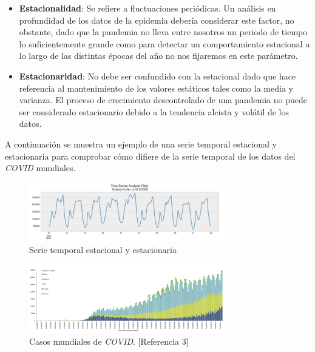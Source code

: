 \documentclass[12pt,a4paper, xcolor=table]{article}
\begin{document}
    \begin{itemize}
    \item \textbf{Estacionalidad}: Se refiere a fluctuaciones periódicas. Un análisis en profundidad de los datos de la epidemia debería considerar este factor, no obstante, dado que la pandemia no lleva entre nosotros un periodo de tiempo lo suficientemente grande como para detectar un comportamiento estacional a lo largo de las distintas épocas del año no nos fijaremos en este parámetro.
    \item \textbf{Estacionaridad}: No debe ser confundido con la estacional dado que hace referencia al mantenimiento de los valores estáticos tales como la media y varianza. El proceso de crecimiento descontrolado de una pandemia no puede ser considerado estacionario debido a la tendencia alcista y volátil de los datos.
    \end{itemize}

    A continuación se muestra un ejemplo de una serie temporal estacional y estacionaria para comprobar cómo difiere de la serie temporal de los datos del \textit{COVID} mundiales.

        \begin{figure}[h]
                \centering
                \includegraphics[width=320px]{img/estacional.png}
                \captionsetup{labelformat=empty}
                \caption{Serie temporal estacional y estacionaria}
            \end{figure}





        \begin{figure}[h]
                \centering
                \includegraphics[width=320px]{img/covid-cases.png}
                \captionsetup{labelformat=empty}
                \caption{Casos mundiales de \textit{COVID}. [Referencia 3]}
            \end{figure}
\end{document}
